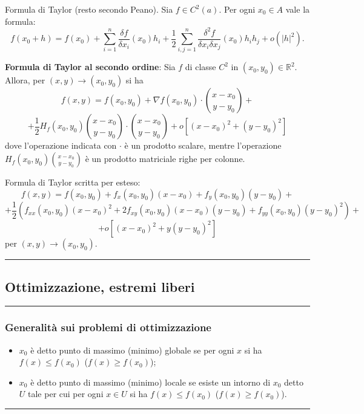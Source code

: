 Formula di Taylor (resto secondo Peano). Sia $f \in C^2(a)$. Per ogni $x_0 \in A$ vale la formula:
\[
    f(x_0 + h) = f(x_0) +\sum_{i=1}^{n}\frac{\delta f}{\delta x_i}(x_0)h_i + \frac{1}{2}\sum_{i,j=1}^{n}\frac{\delta^2f}{\delta x_i \delta x_j}(x_0) h_i h_j +o(|h|^2).
\]
\begin{tcolorbox}
    \textbf{Formula di Taylor al secondo ordine}:\newline
    Sia $f$ di classe $C^2$ in $(x_0,y_0) \in \mathbb{R}^2$. Allora, per $(x,y) \rightarrow  (x_0, y_0)$ si ha 
    \[
        f(x,y) = f(x_0,y_0) + \nabla f(x_0,y_0) \cdot \binom{x-x_0}{y-y_0} + 
    \]
    \[
        +\frac{1}{2} H_f(x_0,y_0) \binom{x-x_0}{y-y_0} \cdot \binom{x-x_0}{y-y_0} + o[(x-x_0)^2 + (y-y_0)^2]
    \]
    dove l'operazione indicata con $\cdot $ è un prodotto scalare, mentre l'operazione $H_f(x_0,y_0) \binom{x-x_0}{y-y_0}$ è un prodotto matriciale righe per colonne.
\end{tcolorbox}
\begin{tcolorbox}
    Formula di Taylor scritta per esteso:
    \[
        f(x,y) = f(x_0, y_0) + f_x(x_0,y_0)(x-x_0) + f_y(x_0,y_0)(y-y_0) +
    \]
    \[
        + \frac{1}{2}\left( f_{xx}(x_0,y_0)(x-x_0)^2 + 2f_{xy}(x_0,y_0)(x-x_0)(y-y_0) + f_{yy}(x_0,y_0)(y-y_0)^2 \right) +
    \]
    \[
        + o[(x-x_0)^2 + y(y-y_0)^2]
    \]
    per $(x,y) \rightarrow (x_0,y_0)$.
\end{tcolorbox}

\rule{\textwidth}{2pt}
\subsection*{Ottimizzazione, estremi liberi}
\rule{\textwidth}{0.4pt}
\subsubsection*{Generalità sui problemi di ottimizzazione}
\begin{itemize}
    \item $x_0$ è detto punto di massimo (minimo) globale se per ogni $x$ si ha $f(x) \leq f(x_0)$ ($f(x) \geq f(x_0)$);
    \item $x_0$ è detto punto di massimo (minimo) locale se esiste un intorno di $x_0$ detto $U$ tale per cui per ogni $x \in U$ si ha $f(x) \leq f(x_0)$ ($f(x) \geq f(x_0)$).
\end{itemize}
\rule{\textwidth}{0.4pt}
